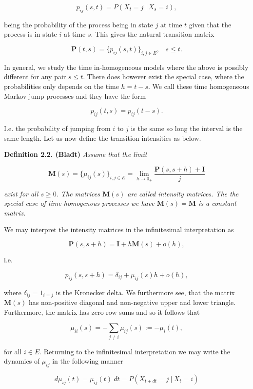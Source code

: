 \documentclass[
]{book}
\begin{document}
\[
p_{ij}(s,t)=P(X_t=j\ \vert\ X_s=i),
\]

being the probability of the process being in state \(j\) at time \(t\) given that the process is in state \(i\) at time \(s\). This gives the natural transition matrix

\[
\mathbf{P}(t,s)=\big\{p_{ij}(s,t)\big\}_{i,j\in E},\hspace{10pt} s\le t.
\]

In general, we study the time in-homogeneous models where the above is possibly different for any pair \(s\le t\). There does however exist the special case, where the probabilities only depends on the time \(h=t-s\). We call these time homogeneous Markov jump processes and they have the form

\[
p_{ij}(t,s)=p_{ij}(t-s).
\]

I.e. the probability of jumping from \(i\) to \(j\) is the same so long the interval is the same length. Let us now define the transition intensities as below.

\textbf{Definition 2.2. (Bladt)} \emph{Assume that the limit}

\[
\mathbf{M}(s)=\big\{\mu_{ij}(s)\big\}_{i,j\in E}=\lim_{h\to 0_+}\frac{\mathbf{P}(s,s+h)+\mathbf{I}}{j}
\]

\emph{exist for all \(s\ge 0\). The matrices \(\mathbf{M}(s)\) are called intensity matrices. The the special case of time-homogenous processes we have \(\mathbf{M}(s)=\mathbf{M}\) is a constant matrix. }

We may interpret the intensity matrices in the infinitesimal interpretation as

\[
\mathbf{P}(s,s+h) = \mathbf{I}+h\mathbf{M}(s)+o(h),
\]

i.e.

\[
p_{ij}(s,s+h)=\delta_{ij}+\mu_{ij}(s)h+o(h),
\]

where \(\delta_{ij}=1_{i=j}\) is the Kronecker delta. We furthermore see, that the matrix \(\mathbf{M}(s)\) has non-positive diagonal and non-negative upper and lower triangle. Furthermore, the matrix has zero row sums and so it follows that

\[
\mu_{ii}(s)=-\sum_{j\ne i}\mu_{ij}(s):=-\mu_{i}(t),
\]

for all \(i\in E\). Returning to the infinitesimal interpretation we may write the dynamics of \(\mu_{ij}\) in the following manner

\[
d\mu_{ij}(t)=\mu_{ij}(t)\ dt=P(X_{t+dt}=j\ \vert\ X_t=i)
\]
\end{document}
